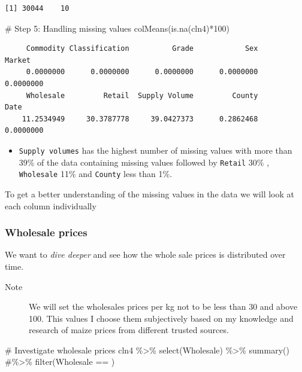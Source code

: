 \documentclass[
  letterpaper,
  DIV=11,
  numbers=noendperiod]{scrartcl}
\newenvironment{Shaded}{\begin{snugshade}}{\end{snugshade}}
\newcommand{\CommentTok}[1]{\textcolor[rgb]{0.37,0.37,0.37}{#1}}
\newcommand{\DecValTok}[1]{\textcolor[rgb]{0.68,0.00,0.00}{#1}}
\newcommand{\FunctionTok}[1]{\textcolor[rgb]{0.28,0.35,0.67}{#1}}
\newcommand{\NormalTok}[1]{\textcolor[rgb]{0.00,0.23,0.31}{#1}}
\newcommand{\SpecialCharTok}[1]{\textcolor[rgb]{0.37,0.37,0.37}{#1}}
\providecommand{\tightlist}{%
  \setlength{\itemsep}{0pt}\setlength{\parskip}{0pt}}\usepackage{longtable,booktabs,array}
\begin{document}
\begin{verbatim}
[1] 30044    10
\end{verbatim}

\begin{Shaded}
\begin{Highlighting}[]
\CommentTok{\# Step 5: Handling missing values}
\FunctionTok{colMeans}\NormalTok{(}\FunctionTok{is.na}\NormalTok{(cln4)}\SpecialCharTok{*}\DecValTok{100}\NormalTok{)}
\end{Highlighting}
\end{Shaded}

\begin{verbatim}
     Commodity Classification          Grade            Sex         Market 
     0.0000000      0.0000000      0.0000000      0.0000000      0.0000000 
     Wholesale         Retail  Supply Volume         County           Date 
    11.2534949     30.3787778     39.0427373      0.2862468      0.0000000 
\end{verbatim}

\begin{itemize}
\tightlist
\item
  \texttt{Supply\ volumes} has the highest number of missing values with
  more than 39\% of the data containing missing values followed by
  \texttt{Retail} 30\% , \texttt{Wholesale} 11\% and \texttt{County}
  less than 1\%.
\end{itemize}

To get a better understanding of the missing values in the data we will
look at each column individually

\subsubsection{Wholesale prices}\label{wholesale-prices}

We want to \emph{dive deeper} and see how the whole sale prices is
distributed over time.

\begin{description}
\item[Note]
We will set the wholesales prices per kg not to be less than 30 and
above 100. This values I choose them subjectively based on my knowledge
and research of maize prices from different trusted sources.
\end{description}

\begin{Shaded}
\begin{Highlighting}[]
\CommentTok{\# Investigate wholesale prices}
\NormalTok{cln4 }\SpecialCharTok{\%\textgreater{}\%} \FunctionTok{select}\NormalTok{(Wholesale) }\SpecialCharTok{\%\textgreater{}\%} \FunctionTok{summary}\NormalTok{() }\CommentTok{\#\%\textgreater{}\% filter(Wholesale == )}
\end{Highlighting}
\end{Shaded}
\end{document}
